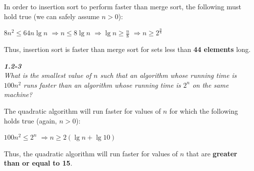 \documentclass[8pt,a4paper]{article}
\begin{document}
In order to insertion sort to perform faster than merge sort, the following must
hold true (we can safely assume $n > 0$):

$8n^{2} \leq 64n \lg n$ \newline
$\Rightarrow n \leq 8 \lg n$ \newline
$\Rightarrow \lg n \geq \frac{n}{8}$ \newline
$\Rightarrow n \geq 2^{\frac{n}{8}}$ \newline
{} \newline

Thus, insertion sort is faster than merge sort for sets less than \textbf{44 elements} long.

\begin{framed}
\textbf{\textit{1.2-3}} \\
\textit{What is the smallest value of $n$ such that an algorithm whose running
time is $100n^{2}$ runs faster than an algorithm whose running time is $2^{n}$
on the same machine?}
\end{framed}

The quadratic algorithm will run faster for values of $n$ for which the following
holds true (again, $n > 0$):

$100n^{2} \leq 2^{n}$ \newline
$\Rightarrow n \geq 2(\lg n + \lg 10)$ \newline
{} \newline

Thus, the quadratic algorithm will run faster for values of $n$ that are
\textbf{greater than or equal to 15}.
\end{document}
